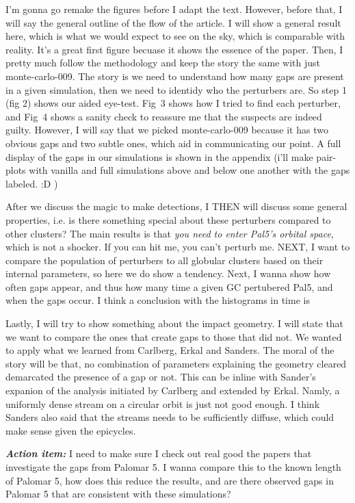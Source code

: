\documentclass[draft]{aa}
\begin{document}
  I'm gonna go remake the figures before I adapt the text. However, before that, I will say the general outline of the flow of the article. I will show a general result here, which is what we would expect to see on the sky, which is comparable with reality. It's a great first figure becuase it shows the essence of the paper. Then, I pretty much follow the methodology and keep the story the same with just monte-carlo-009. The story is we need to understand how many gaps are present in a given simulation, then we need to identidy who the perturbers are. So step 1 (fig 2) shows our aided eye-test. Fig~3 shows how I tried to find each perturber, and Fig~4 shows a sanity check to reassure me that the suspects are indeed guilty. However, I will say that we picked monte-carlo-009 because it has two obvious gaps and two subtle ones, which aid in communicating our point. A full display of the gaps in our simulations is shown in the appendix (i'll make pair-plots with vanilla and full simulations above and below one another with the gaps labeled. :D ) 

  After we discuss the magic to make detections, I THEN will discuss some general properties, i.e. is there something special about these perturbers compared to other clusters? The main results is that \textit{you need to enter Pal5's orbital space}, which is not a shocker. If you can hit me, you can't perturb me. NEXT, I want to compare the population of perturbers to all globular clusters based on their internal parameters, so here we do show a tendency. Next, I wanna show how often gaps appear, and thus how many time a given GC pertubered Pal5, and when the gaps occur. I think a conclusion with the histograms in time is 

  Lastly, I will try to show something about the impact geometry. I will state that we want to compare the ones that create gaps to those that did not. We wanted to apply what we learned from Carlberg, Erkal and Sanders. The moral of the story will be that, no combination of parameters explaining the geometry cleared demarcated the presence of a gap or not. This can be inline with Sander's expanion of the analysis initiated by Carlberg and extended by Erkal. Namly, a uniformly dense stream on a circular orbit is just not good enough. I think Sanders also said that the streams needs to be sufficiently diffuse, which could make sense given the epicycles. 


  \textbf{\textit{Action item:}} I need to make sure I check out real good the papers that investigate the gaps from Palomar 5. I wanna compare this to the known length of Palomar 5, how does this reduce the results, and are there observed gaps in Palomar 5 that are consistent with these simulations? 
\end{document}
